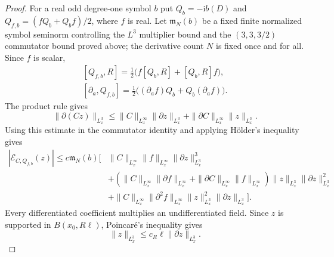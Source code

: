 \documentclass[11pt,a4paper]{article}
\numberwithin{equation}{section}
\newcommand{\f}[2]{\frac{#1}{#2}}
\newcommand{\ii}{\mathrm{i}}
\theoremstyle{definition}
\begin{document}
\begin{proof}
For a real odd degree-one symbol $b$ put $Q_b=-\ii b(D)$ and
$Q_{f,b}=(fQ_b+Q_bf)/2$, where $f$ is real. Let $\mathfrak m_N(b)$
be a fixed finite normalized symbol seminorm controlling the $L^3$
multiplier bound and the $(3,3,3/2)$ commutator bound proved above;
the derivative count $N$ is fixed once and for all.
Since $f$ is scalar,
\begin{equation*}
\begin{gathered}
[Q_{f,b},R]=\f12\big(f[Q_b,R]+[Q_b,R]f\big),\\
[\partial_a,Q_{f,b}]=\f12\big((\partial_af)Q_b+Q_b(\partial_af)\big).
\end{gathered}
\end{equation*}
The product rule gives
\begin{equation*}
\|\partial(Cz)\|_{L^3_x}
\leq\|C\|_{L^\infty_x}\|\partial z\|_{L^3_x}
    +\|\partial C\|_{L^\infty_x}\|z\|_{L^3_x}.
\end{equation*}
Using this estimate in the commutator identity and applying H\"older's
inequality gives
\begin{equation*}
\begin{split}
|\mathcal E_{C,Q_{f,b}}(z)|\leq c\mathfrak m_N(b)\big[&
 \|C\|_{L^{\infty}_x}\|f\|_{L^{\infty}_x} \|\partial z\|_{L^3_x}^3\\
 &+(\|C\|_{L^{\infty}_x}\|\partial f\|_{L^{\infty}_x}
       +\|\partial C\|_{L^{\infty}_x}\|f\|_{L^{\infty}_x})\|z\|_{L^3_x}\|\partial z\|_{L^3_x}^2\\
 &+\|C\|_{L^{\infty}_x}\|\partial^2f\|_{L^{\infty}_x} \|z\|_{L^3_x}^2\|\partial z\|_{L^3_x}\big].
\end{split}
\end{equation*}
Every differentiated coefficient multiplies an undifferentiated field.
Since $z$ is supported in $B(x_0,R\ell)$, Poincar\'e's inequality gives
\begin{equation*}
\|z\|_{L^3_x}\leq c_R\ell\|\partial z\|_{L^3_x}.
\end{equation*}


\end{proof}
\end{document}
